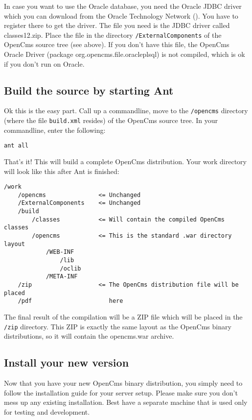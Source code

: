 In case you want to use the Oracle database, you need the Oracle JDBC driver
which you can download from the Oracle Technology Network 
(). You have to register 
there to get the driver. The file 
you need is the JDBC driver called classes12.zip. Place the file in the 
directory \texttt{/ExternalComponents} of the OpenCms source tree (see above). If you 
don't have this file, the OpenCms Oracle Driver 
(package org.opencms.file.oracleplsql) is not compiled, which is ok if you 
don't run on Oracle.

\subsection{Build the source by starting Ant}

Ok this is the easy part. Call up a commandline, move to the \texttt{/opencms} 
directory (where the file \texttt{build.xml} resides) of the OpenCms source tree. 
In your commandline, enter the following: 

\texttt{ant all} 

That's it! This will build a complete OpenCms distribution. Your work 
directory will look like this after Ant is finished: 

\begin{verbatim}
/work
    /opencms               <= Unchanged
    /ExternalComponents    <= Unchanged
    /build
        /classes           <= Will contain the compiled OpenCms classes
        /opencms           <= This is the standard .war directory layout
            /WEB-INF
                /lib
                /oclib
            /META-INF
    /zip                   <= The OpenCms distribution file will be placed
    /pdf                      here
\end{verbatim}


The final result of the compilation will be a ZIP file which will be placed 
in the \texttt{/zip} directory. This ZIP is exactly the same layout as the OpenCms
binary distributions, so it will contain the opencms.war archive. 

\subsection{Install your new version}

Now that you have your new OpenCms binary distribution, you simply need to 
follow the installation guide for your server setup. Please make sure you 
don't mess up any existing installation. Best have a separate machine that 
is used only for testing and development. 

